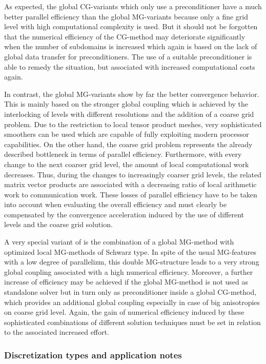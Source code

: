 As expected, the global CG-variants which only use a \ols{} preconditioner have a much better parallel efficiency than the global MG-variants because only a fine grid level with high computational complexity is used. But it should not be forgotten that the numerical efficiency 
of the CG-method may deteriorate significantly when the number of subdomains is increased 
which again is based on the lack of global data transfer for \ols{} preconditioners. The use of a suitable \tls{} preconditioner is able to remedy the situation, but associated with increased computational costs again.

In contrast, the global MG-variants show by far the better convergence behavior. This is mainly based on the stronger global coupling
which is achieved by the interlocking of levels with different resolutions and the addition of a coarse grid problem. 
Due to the restriction to local tensor product meshes, very sophisticated smoothers can be used which are capable of fully exploiting modern processor capabilities.
On the other hand, the coarse grid problem represents the already described bottleneck in terms of parallel efficiency. Furthermore, with every change to the next coarser grid level, the amount of local computational work decreases. Thus, during the changes to increasingly coarser grid levels, the related matrix vector products are associated with a decreasing ratio of local arithmetic work to communication work. These losses of parallel efficiency have to be taken into account when evaluating the overall efficiency and must clearly be compensated by the convergence acceleration induced by the use of different levels and the coarse grid solution.

A very special variant of \scarc{} is the combination of a global MG-method with optimized local MG-methods of Schwarz type. In spite of the usual MG-features with a low degree of parallelizm, this double MG-structure leads to a very strong global coupling associated with a high numerical efficiency. 
Moreover, a further increase of efficiency may be achieved if the global MG-method is not used as standalone solver but in turn only as preconditioner inside a global CG-method, which provides an additional global coupling especially in case of big anisotropies on coarse grid level.
Again, the gain of numerical efficiency induced by these sophisticated combinations of different solution techniques must be set in relation to the associated increased effort.


\subsubsection{Discretization types and application notes}
\label{SEC_SCARC_application_notes}

